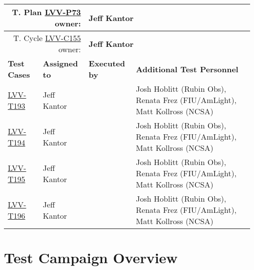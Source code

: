 \documentclass[DM,lsstdraft,STR,toc]{lsstdoc}
\begin{document}
{\small
\begin{longtable}{p{3cm}p{3cm}p{3cm}p{6cm}}
\hline
\multicolumn{2}{r}{T. Plan \href{https://jira.lsstcorp.org/secure/Tests.jspa\#/testPlan/LVV-P73}{LVV-P73} owner:} &
\multicolumn{2}{l}{\textbf{ Jeff Kantor } }\\\hline
\multicolumn{2}{r}{T. Cycle \href{https://jira.lsstcorp.org/secure/Tests.jspa\#/testCycle/LVV-C155}{LVV-C155} owner:} &
\multicolumn{2}{l}{\textbf{
Jeff Kantor }
} \\\hline
\textbf{Test Cases} & \textbf{Assigned to} & \textbf{Executed by} & \textbf{Additional Test Personnel} \\ \hline
\href{https://jira.lsstcorp.org/secure/Tests.jspa#/testCase/LVV-T193}{LVV-T193}
& {\small Jeff Kantor } & {\small  } &
\begin{minipage}[]{6cm}
\smallskip
{\small Josh Hoblitt (Rubin Obs), Renata Frez (FIU/AmLight), Matt Kollross
(NCSA) }
\medskip
\end{minipage}
\\ \hline
\href{https://jira.lsstcorp.org/secure/Tests.jspa#/testCase/LVV-T194}{LVV-T194}
& {\small Jeff Kantor } & {\small  } &
\begin{minipage}[]{6cm}
\smallskip
{\small Josh Hoblitt (Rubin Obs), Renata Frez (FIU/AmLight), Matt Kollross
(NCSA) }
\medskip
\end{minipage}
\\ \hline
\href{https://jira.lsstcorp.org/secure/Tests.jspa#/testCase/LVV-T195}{LVV-T195}
& {\small Jeff Kantor } & {\small  } &
\begin{minipage}[]{6cm}
\smallskip
{\small Josh Hoblitt (Rubin Obs), Renata Frez (FIU/AmLight), Matt Kollross
(NCSA) }
\medskip
\end{minipage}
\\ \hline
\href{https://jira.lsstcorp.org/secure/Tests.jspa#/testCase/LVV-T196}{LVV-T196}
& {\small Jeff Kantor } & {\small  } &
\begin{minipage}[]{6cm}
\smallskip
{\small Josh Hoblitt (Rubin Obs), Renata Frez (FIU/AmLight), Matt Kollross
(NCSA) }
\medskip
\end{minipage}
\\ \hline
\end{longtable}
}

\newpage

\section{Test Campaign Overview}
\label{sect:overview}
\end{document}
